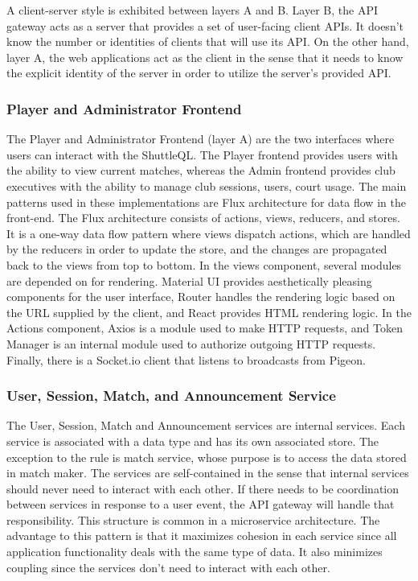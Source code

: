 \documentclass{article}
\begin{document}
A client-server style is exhibited between layers A and B. Layer B, the API gateway acts as a server that provides a set of user-facing client APIs. It doesn't know the number or identities of clients that will use its API. On the other hand, layer A, the web applications act as the client in the sense that it needs to know the explicit identity of the server in order to utilize the server's provided API.

\subsubsection{Player and Administrator Frontend}
The Player and Administrator Frontend (layer A) are the two interfaces where users can interact with the ShuttleQL. The Player frontend provides users with the ability to view current matches, whereas the Admin frontend provides club executives with the ability to manage club sessions, users, court usage. The main patterns used in these implementations are Flux architecture for data flow in the front-end. The Flux architecture consists of actions, views, reducers, and stores. It is a one-way data flow pattern where views dispatch actions, which are handled by the reducers in order to update the store, and the changes are propagated back to the views from top to bottom. In the views component, several modules are depended on for rendering. Material UI provides aesthetically pleasing components for the user interface, Router handles the rendering logic based on the URL supplied by the client, and React provides HTML rendering logic. In the Actions component, Axios is a module used to make HTTP requests, and Token Manager is an internal module used to authorize outgoing HTTP requests. Finally, there is a Socket.io client that listens to broadcasts from Pigeon.

\subsubsection{User, Session, Match, and Announcement Service}
The User, Session, Match and Announcement services are internal services. Each service is associated with a data type and has its own associated store. The exception to the rule is match service, whose purpose is to access the data stored in match maker. The services are self-contained in the sense that internal services should never need to interact with each other. If there needs to be coordination between services in response to a user event, the API gateway will handle that responsibility. This structure is common in a microservice architecture. The advantage to this pattern is that it maximizes cohesion in each service since all application functionality deals with the same type of data. It also minimizes coupling since the services don't need to interact with each other.
\end{document}
